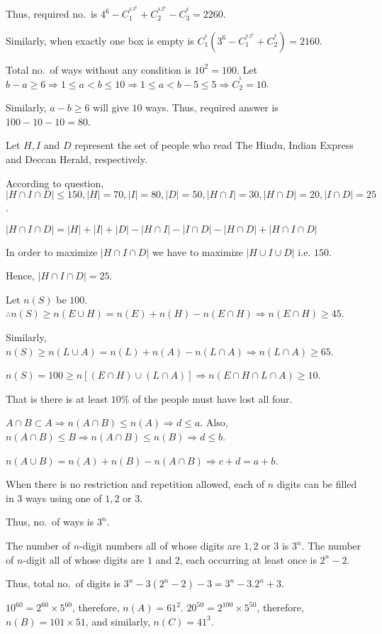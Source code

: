   Thus, required no.\ is $4^6 - C_1^^4.3^6 + C_2^^4.2^6 - C_3^^4 = 2260$.

  Similarly, when exactly one box is empty is $C_1^^4(3^6 - C_1^^3.2^6 + C_2^^3) = 2160$.
\item Total no.\ of ways without any condition is $10^2 = 100$. Let $b - a\geq 6 \Rightarrow 1\leq a<b\leq
  10\Rightarrow 1\leq a< b - 5\leq 5\Rightarrow C_2^^5 = 10$.

  Similarly, $a - b\geq 6$ will give $10$ ways. Thus, required answer is $100 - 10 - 10 = 80$.
\item Let $H, I$ and $D$ represent the set of people who read The Hindu, Indian Express and Deccan Herald,
  respectively.

  According to question, $|H\cap I\cap D|\leq 150, |H| = 70, |I| = 80, |D| = 50, |H\cap I| = 30, |H\cap D| =
  20, |I\cap D| = 25$.

  $|H\cap I\cap D| = |H| + |I| + |D| - |H\cap I| - |I\cap D| - |H\cap D| + |H\cap I\cap D|$

  In order to maximize $|H\cap I\cap D|$ we have to maximize $|H\cup I\cup D|$ i.e. $150$.

  Hence, $|H\cap I\cap D| = 25$.
\item Let $n(S)$ be $100$. $\therefore n(S)\geq n(E\cup H) = n(E) + n(H) - n(E\cap H) \Rightarrow n(E\cap
  H)\geq 45$.

  Similarly, $n(S)\geq n(L\cup A) = n(L) + n(A) - n(L\cap A) \Rightarrow n(L\cap A)\geq 65$.

  $n(S) = 100\geq n[(E\cap H)\cup (L\cap A)]\Rightarrow n(E\cap H\cap L\cap A)\geq 10$.

  That is there is at least $10\%$ of the people must have lost all four.
\item $A\cap B\subset A \Rightarrow n(A\cap B)\leq n(A) \Rightarrow d \leq a$. Also, $n(A\cap B)\leq B
  \Rightarrow n(A\cap B)\leq n(B) \Rightarrow d\leq b$.

  $n(A\cup B) = n(A) + n(B) - n(A\cap B) \Rightarrow c + d = a + b$.
\item When there is no restriction and repetition allowed, each of $n$ digits can be filled in $3$ ways
  using one of $1, 2$ or $3$.

  Thus, no.\ of ways is $3^n$.

  The number of $n$-digit numbers all of whose digits are $1, 2$ or $3$ is $3^n$. The number of $n$-digit
  all of whose digits are $1$ and $2$, each occurring at least once is $2^n - 2$.

  Thus, total no.\ of digits is $3^n - 3(2^n - 2) - 3 = 3^n - 3.2^n + 3$.
\item $10^{60} = 2^{60}\times5^{60}$, therefore, $n(A) = 61^2$. $20^{50} = 2^{100}\times5^{50}$, therefore,
  $n(B) = 101\times51$, and similarly, $n(C) = 41^3$.

